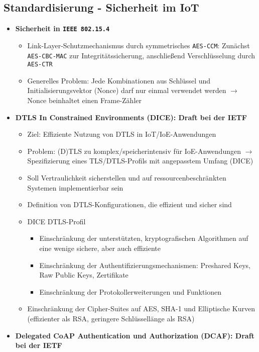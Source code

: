 \subsection{Standardisierung - Sicherheit im IoT}
\begin{itemize}
	\item \textbf{Sicherheit in \texttt{IEEE 802.15.4}}
	\begin{itemize}
		\item Link-Layer-Schutzmechanismus durch symmetrisches \texttt{AES-CCM}: Zunächst \texttt{AES-CBC-MAC} zur Integritätssicherung, anschließend Verschlüsselung durch \texttt{AES-CTR}
		\item Generelles Problem: Jede Kombinationen aus Schlüssel und Initialisierungsvektor (Nonce) darf nur einmal verwendet werden \(\rightarrow\) Nonce beinhaltet einen Frame-Zähler
	\end{itemize}
	\item \textbf{DTLS In Constrained Environments (DICE): Draft bei der IETF}
	\begin{itemize}
		\item Ziel: Effiziente Nutzung von DTLS in IoT/IoE-Anwendungen
		\item Problem: (D)TLS zu komplex/speicherintensiv für IoE-Anwendungen \(\rightarrow\) Spezifizierung eines TLS/DTLS-Profils mit angepasstem Umfang (DICE)
		\item Soll Vertraulichkeit sicherstellen und auf ressourcenbeschränkten Systemen implementierbar sein
		\item Definition von DTLS-Konfigurationen, die effizient und sicher sind
		\item DICE DTLS-Profil
		\begin{itemize}
			\item Einschränkung der unterstützten, kryptografischen Algorithmen auf eine wenige sichere, aber auch effiziente
			\item Einschränkung der Authentifizierungsmechanismen: Preshared Keys, Raw Public Keys, Zertifikate
			\item Einschränkung der Protokollerweiterungen und Funktionen
		\end{itemize}
		\item Einschränkung der Cipher-Suites auf AES, SHA-1 und Elliptische Kurven (effizienter als RSA, geringere Schlüssellänge als RSA)
	\end{itemize}
	\item \textbf{Delegated CoAP Authentication und Authorization (DCAF): Draft bei der IETF}
	\begin{itemize}

\end{itemize}
\end{itemize}

